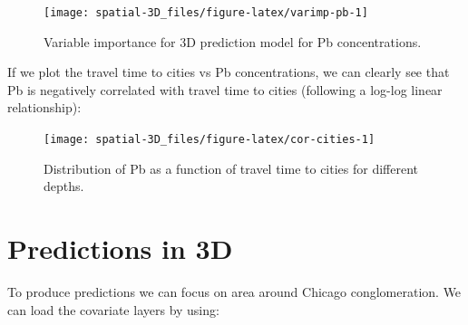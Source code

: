 \documentclass[
  graybox,natbib,nospthms]{svmono}
\newenvironment{Shaded}{\begin{snugshade}}{\end{snugshade}}
\newcommand{\AttributeTok}[1]{\textcolor[rgb]{0.61,0.61,0.61}{#1}}
\newcommand{\CommentTok}[1]{\textcolor[rgb]{0.37,0.37,0.37}{\textit{#1}}}
\newcommand{\ConstantTok}[1]{\textcolor[rgb]{0,0,0}{#1}}
\newcommand{\DecValTok}[1]{\textcolor[rgb]{0.06,0.06,0.06}{#1}}
\newcommand{\FunctionTok}[1]{\textcolor[rgb]{0,0,0}{#1}}
\newcommand{\NormalTok}[1]{#1}
\newcommand{\SpecialCharTok}[1]{\textcolor[rgb]{0,0,0}{#1}}
\newcommand{\StringTok}[1]{\textcolor[rgb]{0.5,0.5,0.5}{#1}}
\begin{document}
\begin{figure}

{\centering \texttt{[image: spatial-3D\_files/figure-latex/varimp-pb-1]} 

}

\caption{Variable importance for 3D prediction model for Pb concentrations.}\label{fig:varimp-pb}
\end{figure}

If we plot the travel time to cities vs Pb concentrations, we can clearly see that
Pb is negatively correlated with travel time to cities (following a log-log linear relationship):

\begin{Shaded}
\end{Shaded}

\begin{figure}

{\centering \texttt{[image: spatial-3D\_files/figure-latex/cor-cities-1]} 

}

\caption{Distribution of Pb as a function of travel time to cities for different depths.}\label{fig:cor-cities}
\end{figure}

\hypertarget{predictions-in-3d}{%
\section{Predictions in 3D}\label{predictions-in-3d}}

To produce predictions we can focus on area around Chicago conglomeration. We can
load the covariate layers by using:
\end{document}

